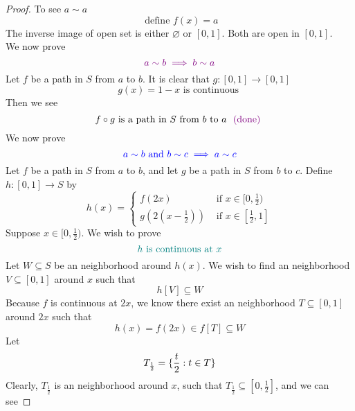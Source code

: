 \documentclass{report}
\begin{document}
\begin{proof}
To see $a\sim a$
\begin{equation*}
\text{ define }f(x)=a
\end{equation*}
The inverse image of open set is either $\varnothing$ or $\left[0,1 \right]$. Both are open in $\left[0,1 \right]$.\\

We now prove 
\begin{equation*}
  \textcolor{violet}{a\sim b\implies b\sim a}
\end{equation*}
Let $f$ be a path in $S$ from $a$ to $b$. It is clear that $g:\left[0,1 \right]\rightarrow \left[0,1 \right]$
\begin{equation*}
g(x)=1-x\text{ is continuous }
\end{equation*}
Then we see 
\begin{equation*}
f\circ g\text{ is a path in $S$ from $b$ to $a$ }\textcolor{violet}{\text{ (done) }}
\end{equation*}
We now prove 
\begin{equation*}
\textcolor{blue}{a\sim b\text{ and }b\sim c\implies a\sim c}
\end{equation*}
Let $f$ be a path in $S$ from  $a$ to $b$, and let $g$ be a path in $S$ from $b$ to $c$. Define $h:\left[0,1 \right]\rightarrow S$ by
\begin{equation*}
h(x)=\begin{cases}
  f(2x)& \text{ if  }x\in [0,\frac{1}{2} )\\
  g(2(x-\frac{1}{2}))& \text{ if  }x\in [\frac{1}{2},1]
\end{cases}
\end{equation*}
Suppose $x\in [0,\frac{1}{2})$. We wish to prove 
\begin{equation*}
  \textcolor{teal}{h\text{ is continuous at }x}
\end{equation*}
Let $W\subseteq S$ be an neighborhood around  $h(x)$. We wish to find an neighborhood $V\subseteq [0,1]$ around $x$ such that 
\begin{equation*}
h[V]\subseteq W
\end{equation*}
Because $f$ is continuous at $2x$, we know there exist an neighborhood $T\subseteq [0,1]$ around $2x$ such that 
 \begin{equation*}
h(x)=f(2x)\in f[T]\subseteq W
\end{equation*}
Let
\begin{equation*}
T_{\frac{1}{2}}=\{ \frac{t}{2}:t \in T \}
\end{equation*}
Clearly, $T_{\frac{1}{2}}$ is an neighborhood around $x$, such that $T_{\frac{1}{2}}\subseteq [0,\frac{1}{2}]$, and we can see

\end{proof}
\end{document}
